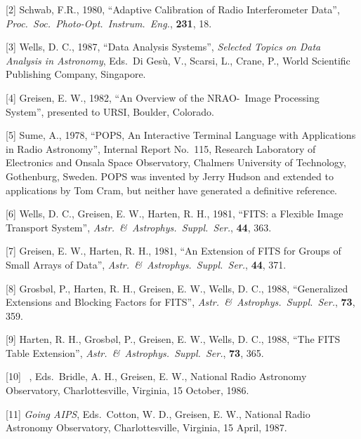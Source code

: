 \item{[2]} Schwab, F.R., 1980, ``Adaptive Calibration of Radio
Interferometer Data'', {\it Proc.~Soc.~Photo-Opt.~Instrum.~Eng.},
{\bf 231}, 18.

\item{[3]} Wells, D. C., 1987, ``Data Analysis Systems'', {\it
Selected Topics on Data Analysis in Astronomy}, Eds.~Di Ges\`u, V.,
Scarsi, L., Crane, P., World Scientific Publishing Company, Singapore.

\item{[4]} Greisen, E. W., 1982, ``An Overview of the NRAO-\AIPS\
Image Processing System'', presented to URSI, Boulder, Colorado.

\item{[5]} Sume, A., 1978, ``POPS, An Interactive Terminal Language with
Applications in Radio Astronomy'', Internal Report No.~115, Research
Laboratory of Electronics and Onsala Space Observatory, Chalmers
University of Technology, Gothenburg, Sweden.  {\af POPS} was invented
by Jerry Hudson and extended to applications by Tom Cram, but neither
have generated a definitive reference.

\item{[6]} Wells, D. C., Greisen, E. W., Harten, R. H., 1981, ``FITS:
a Flexible Image Transport System'', {\it Astr.~\&\ Astrophys.~Suppl.~Ser.},
{\bf 44}, 363.

\item{[7]} Greisen, E. W., Harten, R. H., 1981, ``An Extension of FITS
for Groups of Small Arrays of Data'', {\it Astr.~\&\ Astrophys.~Suppl.~Ser.},
{\bf 44}, 371.

\item{[8]} Grosb\o l, P., Harten, R. H., Greisen, E. W., Wells, D. C.,
1988, ``Generalized Extensions and Blocking Factors for FITS'',
{\it Astr.~\&\ Astrophys.~Suppl.~Ser.}, {\bf 73}, 359.

\item{[9]} Harten, R. H., Grosb\o l, P., Greisen, E. W., Wells, D. C.,
1988, ``The FITS Table Extension'', {\it Astr.~\&\ Astrophys.~Suppl.~Ser.},
{\bf 73}, 365.

\item{[10]} \AIPS\ \Cookbook, Eds.~Bridle, A. H., Greisen, E. W.,
National Radio Astronomy Observatory, Charlottesville, Virginia, 15 October,
1986.

\item{[11]} {\it Going AIPS}, Eds.~Cotton, W. D., Greisen, E. W.,
National Radio Astronomy Observatory, Charlottesville, Virginia, 15 April,
1987.

